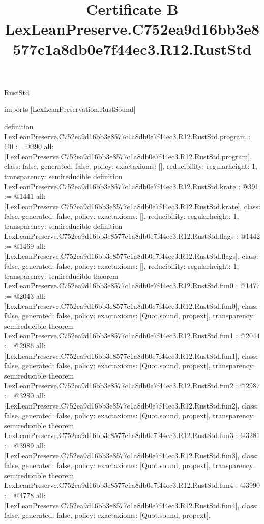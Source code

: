 \begin{lexlean}{RustStd}
\title{Certificate B LexLeanPreserve.C752ea9d16bb3e8577c1a8db0e7f44ec3.R12.RustStd}
\begin{coremodule}
imports [LexLeanPreservation.RustSound]

definition LexLeanPreserve.C752ea9d16bb3e8577c1a8db0e7f44ec3.R12.RustStd.program : @0 := @390 {
  all: [LexLeanPreserve.C752ea9d16bb3e8577c1a8db0e7f44ec3.R12.RustStd.program],
  class: false,
  generated: false,
  policy: exact{axioms: []},
  reducibility: regular{height: 1},
  transparency: semireducible
}
definition LexLeanPreserve.C752ea9d16bb3e8577c1a8db0e7f44ec3.R12.RustStd.krate : @391 := @1441 {
  all: [LexLeanPreserve.C752ea9d16bb3e8577c1a8db0e7f44ec3.R12.RustStd.krate],
  class: false,
  generated: false,
  policy: exact{axioms: []},
  reducibility: regular{height: 1},
  transparency: semireducible
}
definition LexLeanPreserve.C752ea9d16bb3e8577c1a8db0e7f44ec3.R12.RustStd.flags : @1442 := @1469 {
  all: [LexLeanPreserve.C752ea9d16bb3e8577c1a8db0e7f44ec3.R12.RustStd.flags],
  class: false,
  generated: false,
  policy: exact{axioms: []},
  reducibility: regular{height: 1},
  transparency: semireducible
}
theorem LexLeanPreserve.C752ea9d16bb3e8577c1a8db0e7f44ec3.R12.RustStd.fun0 : @1477 := @2043 {
  all: [LexLeanPreserve.C752ea9d16bb3e8577c1a8db0e7f44ec3.R12.RustStd.fun0],
  class: false,
  generated: false,
  policy: exact{axioms: [Quot.sound, propext]},
  transparency: semireducible
}
theorem LexLeanPreserve.C752ea9d16bb3e8577c1a8db0e7f44ec3.R12.RustStd.fun1 : @2044 := @2986 {
  all: [LexLeanPreserve.C752ea9d16bb3e8577c1a8db0e7f44ec3.R12.RustStd.fun1],
  class: false,
  generated: false,
  policy: exact{axioms: [Quot.sound, propext]},
  transparency: semireducible
}
theorem LexLeanPreserve.C752ea9d16bb3e8577c1a8db0e7f44ec3.R12.RustStd.fun2 : @2987 := @3280 {
  all: [LexLeanPreserve.C752ea9d16bb3e8577c1a8db0e7f44ec3.R12.RustStd.fun2],
  class: false,
  generated: false,
  policy: exact{axioms: [Quot.sound, propext]},
  transparency: semireducible
}
theorem LexLeanPreserve.C752ea9d16bb3e8577c1a8db0e7f44ec3.R12.RustStd.fun3 : @3281 := @3989 {
  all: [LexLeanPreserve.C752ea9d16bb3e8577c1a8db0e7f44ec3.R12.RustStd.fun3],
  class: false,
  generated: false,
  policy: exact{axioms: [Quot.sound, propext]},
  transparency: semireducible
}
theorem LexLeanPreserve.C752ea9d16bb3e8577c1a8db0e7f44ec3.R12.RustStd.fun4 : @3990 := @4778 {
  all: [LexLeanPreserve.C752ea9d16bb3e8577c1a8db0e7f44ec3.R12.RustStd.fun4],
  class: false,
  generated: false,
  policy: exact{axioms: [Quot.sound, propext]},
}
\end{coremodule}
\end{lexlean}
